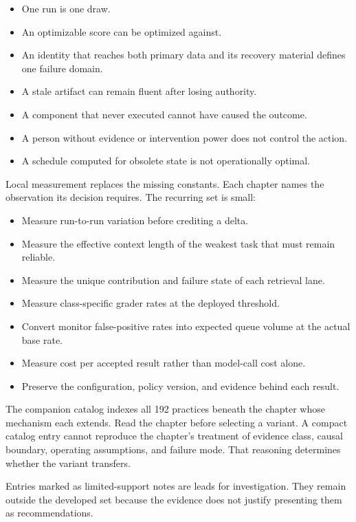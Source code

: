 \begin{itemize}
\tightlist
\item
  One run is one draw.
\item
  An optimizable score can be optimized against.
\item
  An identity that reaches both primary data and its recovery material defines one failure domain.
\item
  A stale artifact can remain fluent after losing authority.
\item
  A component that never executed cannot have caused the outcome.
\item
  A person without evidence or intervention power does not control the action.
\item
  A schedule computed for obsolete state is not operationally optimal.
\end{itemize}

Local measurement replaces the missing constants. Each chapter names the observation its decision requires. The recurring set is small:

\begin{itemize}
\tightlist
\item
  Measure run-to-run variation before crediting a delta.
\item
  Measure the effective context length of the weakest task that must remain reliable.
\item
  Measure the unique contribution and failure state of each retrieval lane.
\item
  Measure class-specific grader rates at the deployed threshold.
\item
  Convert monitor false-positive rates into expected queue volume at the actual base rate.
\item
  Measure cost per accepted result rather than model-call cost alone.
\item
  Preserve the configuration, policy version, and evidence behind each result.
\end{itemize}

The companion catalog indexes all 192 practices beneath the chapter whose mechanism each extends. Read the chapter before selecting a variant. A compact catalog entry cannot reproduce the chapter's treatment of evidence class, causal boundary, operating assumptions, and failure mode. That reasoning determines whether the variant transfers.

Entries marked as limited-support notes are leads for investigation. They remain outside the developed set because the evidence does not justify presenting them as recommendations.

